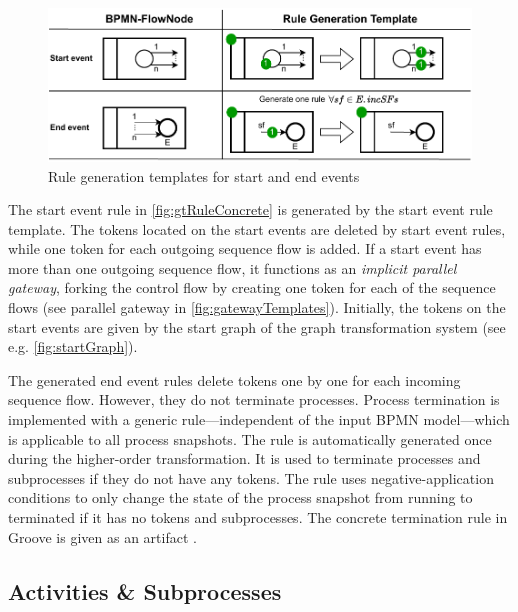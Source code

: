 \documentclass[submission, copyright, creativecommons]{eptcs}
\begin{document}
\begin{figure}[h]
    \centering
    \includegraphics[width=.9\textwidth]{images/start_end_template.pdf}
    \caption{Rule generation templates for start and end events}
    \label{fig:startAndEndTemplate}
\end{figure}

The start event rule in \autoref{fig:gtRuleConcrete} is generated by the start event rule template.
The tokens located on the start events are deleted by start event rules, while one token for each outgoing sequence flow is added.
If a start event has more than one outgoing sequence flow, it functions as an \textit{implicit parallel gateway}, forking the control flow by creating one token for each of the sequence flows (see parallel gateway in \autoref{fig:gatewayTemplates}).
Initially, the tokens on the start events are given by the start graph of the graph transformation system (see e.g. \autoref{fig:startGraph}).
    
The generated end event rules delete tokens one by one for each incoming sequence flow.
However, they do not terminate processes.
Process termination is implemented with a generic rule---independent of the input BPMN model---which is applicable to all process snapshots.
The rule is automatically generated once during the higher-order transformation.
It is used to terminate processes and subprocesses if they do not have any tokens.
The rule uses negative-application conditions to only change the state of the process snapshot from running to terminated if it has no tokens and subprocesses.
The concrete termination rule in Groove is given as an artifact \cite{timkrauterArtifactsTERMGRAPH2022}.

\subsection{Activities \& Subprocesses}
\end{document}
